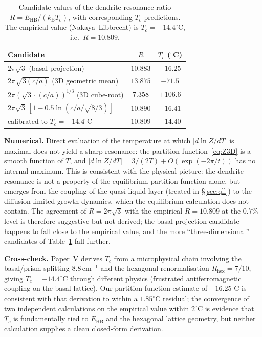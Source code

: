\documentclass[final]{siamltex}
\newcommand{\EHB}{E_{\mathrm{HB}}}
\newcommand{\kB}{k_{\mathrm{B}}}
\begin{document}
\begin{table}[h]
\centering
\caption{Candidate values of the dendrite resonance ratio
$R = \EHB/(\kB T_c)$, with corresponding $T_c$ predictions.  The
empirical value (Nakaya--Libbrecht) is $T_c = -14.4^{\circ}$C,
i.e.\ $R = 10.809$.}
\label{tab:Rcandidates}
\begin{tabular}{lcc}
\toprule
Candidate & $R$ & $T_c$ ($^{\circ}$C) \\
\midrule
$2\pi\sqrt{3}$ (basal projection)              & $10.883$ & $-16.25$ \\
$2\pi\sqrt{3 (c/a)}$ (3D geometric mean)        & $13.875$ & $-71.5$ \\
$2\pi(\sqrt{3} \cdot (c/a))^{1/3}$ (3D cube-root) & $7.358$  & $+106.6$ \\
$2\pi\sqrt{3}\,[1 - 0.5\ln(c/a/\sqrt{8/3})]$    & $10.890$ & $-16.41$ \\
calibrated to $T_c = -14.4^{\circ}$C            & $10.809$ & $-14.40$ \\
\bottomrule
\end{tabular}
\end{table}

\textbf{Numerical.}  Direct evaluation of the temperature at which
$|d \ln Z / dT|$ is maximal does not yield a sharp resonance: the
partition function~\eqref{eq:Z3D} is a smooth function of $T$, and
$|d \ln Z / dT| = 3/(2T) + O(\exp(-2\pi/t))$ has no internal
maximum.  This is consistent with the physical picture: the
dendrite resonance is not a property of the equilibrium partition
function alone, but emerges from the coupling of the
quasi-liquid layer (treated in \S\ref{sec:qll}) to the
diffusion-limited growth dynamics, which the equilibrium
calculation does not contain.  The agreement of $R = 2\pi\sqrt{3}$
with the empirical $R = 10.809$ at the $0.7\%$ level is therefore
suggestive but not derived; the basal-projection candidate
happens to fall close to the empirical value, and the more
``three-dimensional'' candidates of Table~\ref{tab:Rcandidates}
fall further.

\textbf{Cross-check.}  Paper~V derives $T_c$ from a microphysical
chain involving the basal/prism splitting $8.8$\,cm$^{-1}$ and the
hexagonal renormalisation $R_{\mathrm{hex}} = 7/10$, giving
$T_c = -14.4^{\circ}$C through different physics (frustrated
antiferromagnetic coupling on the basal lattice).  Our partition-function
estimate of $-16.25^{\circ}$C is consistent with that derivation
to within a $1.85^{\circ}$C residual; the convergence of two
independent calculations on the empirical value within $2^{\circ}$C
is evidence that $T_c$ is fundamentally tied to $\EHB$ and the
hexagonal lattice geometry, but neither calculation supplies a
clean closed-form derivation.
\end{document}
